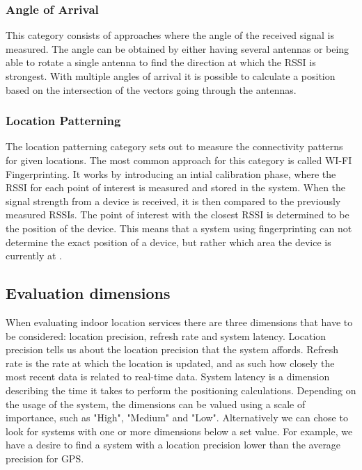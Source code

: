 \subsubsection*{Angle of Arrival}
This category consists of approaches where the angle of the received signal is measured. The angle can be obtained by either having several antennas or being able to rotate a single antenna to find the direction at which the RSSI is strongest. With multiple angles of arrival it is possible to calculate a position based on the intersection of the vectors going through the antennas.

\subsubsection*{Location Patterning}
The location patterning category sets out to measure the connectivity patterns for given locations. The most common approach for this category is called WI-FI Fingerprinting. It works by introducing an intial calibration phase, where the RSSI for each point of interest is measured and stored in the system. When the signal strength from a device is received, it is then compared to the previously measured RSSIs. The point of interest with the closest RSSI is determined to be the position of the device. This means that a system using fingerprinting can not determine the exact position of a device, but rather which area the device is currently at \cite{fingerprint1}.

\subsection{Evaluation dimensions}
When evaluating indoor location services there are three dimensions that have to be considered: location precision, refresh rate and system latency. Location precision tells us about the location precision that the system affords. Refresh rate is the rate at which the location is updated, and as such how closely the most recent data is related to real-time data. System latency is a dimension describing the time it takes to perform the positioning calculations\cite{dimensions}. Depending on the usage of the system, the dimensions can be valued using a scale of importance, such as "High", "Medium" and "Low". Alternatively we can chose to look for systems with one or more dimensions below a set value. For example, we have a desire to find a system with a location precision lower than the average precision for GPS. 

